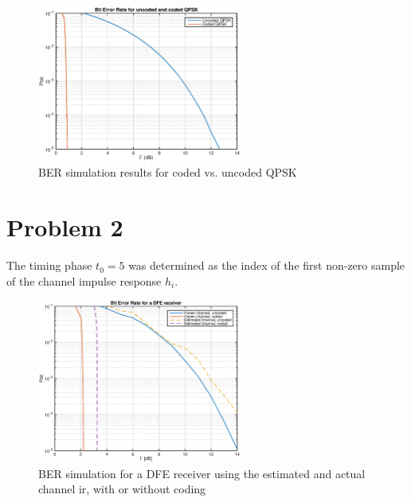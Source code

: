 \documentclass[10pt]{article}
\begin{document}
\begin{figure}
	\centering
	\includegraphics[width = 0.6\textwidth]{problem1}
	\caption{BER simulation results for coded vs. uncoded QPSK}
	\label{fig:problem1_pbit}
\end{figure}




\section*{Problem 2}
The timing phase $t_0 = 5$ was determined as the index of the first non-zero sample of the channel impulse response ${h_i}$.




\begin{figure}
	\centering
	\includegraphics[width = 0.6\textwidth]{problem2}
	\caption{BER simulation for a DFE receiver using the estimated and actual channel ir, with or without coding}
	\label{fig:problem2_pbit}
\end{figure}
\end{document}

